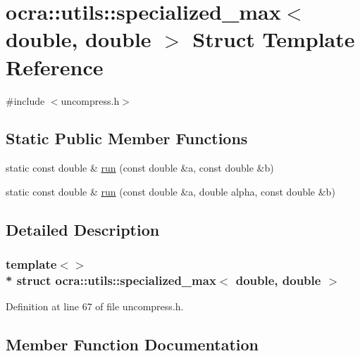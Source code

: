 \hypertarget{structocra_1_1utils_1_1specialized__max_3_01double_00_01double_01_4}{}\section{ocra\+:\+:utils\+:\+:specialized\+\_\+max$<$ double, double $>$ Struct Template Reference}
\label{structocra_1_1utils_1_1specialized__max_3_01double_00_01double_01_4}


{\ttfamily \#include $<$uncompress.\+h$>$}

\subsection*{Static Public Member Functions}
\begin{DoxyCompactItemize}
\item 
static const double \& \hyperlink{structocra_1_1utils_1_1specialized__max_3_01double_00_01double_01_4_a6a017a4bca601f01e4a40c2e34761388}{run} (const double \&a, const double \&b)
\item 
static const double \& \hyperlink{structocra_1_1utils_1_1specialized__max_3_01double_00_01double_01_4_a61ca4eb326268e49b5e44cd042dde4ce}{run} (const double \&a, double alpha, const double \&b)
\end{DoxyCompactItemize}


\subsection{Detailed Description}
\subsubsection*{template$<$$>$\\*
struct ocra\+::utils\+::specialized\+\_\+max$<$ double, double $>$}



Definition at line 67 of file uncompress.\+h.



\subsection{Member Function Documentation}
